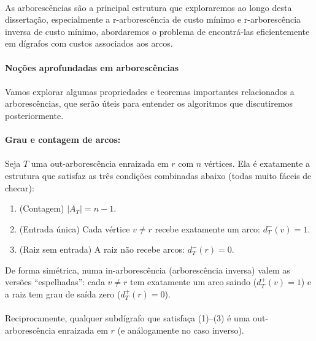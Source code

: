 \documentclass[12pt,a4paper]{article}
\def\emph#1{#1}%
\begin{document}
\paragraph{}
As arborescências são a principal estrutura que exploraremos ao longo desta dissertação, especialmente a r-arborescência de custo mínimo e r-arborescência inversa de custo mínimo, abordaremos o problema de encontrá-las eficientemente em dígrafos com custos associados aos arcos.



\paragraph{Noções aprofundadas em arborescências}

\paragraph{}
Vamos explorar algumas propriedades e teoremas importantes relacionados a arborescências, que serão úteis para entender os algoritmos que discutiremos posteriormente.

\paragraph{Grau e contagem de arcos:}
\paragraph{}
Seja $T$ uma out-arborescência enraizada em $r$ com $n$ vértices. Ela é exatamente a estrutura que satisfaz as três condições combinadas abaixo (todas muito fáceis de checar):
\begin{enumerate}\setlength{\itemsep}{2pt}
    \item (Contagem) $|A_T| = n-1$.
    \item (Entrada única) Cada vértice $v\neq r$ recebe exatamente um arco: $d_T^-(v)=1$.
    \item (Raiz sem entrada) A raiz não recebe arcos: $d_T^-(r)=0$.
\end{enumerate}
De forma simétrica, numa in-arborescência (arborescência inversa) valem as versões “espelhadas”: cada $v\neq r$ tem exatamente um arco \emph{saindo} ($d_T^+(v)=1$) e a raiz tem grau de saída zero ($d_T^+(r)=0$).

\paragraph{}
Reciprocamente, qualquer subdígrafo que satisfaça (1)--(3) é uma out-arborescência enraizada em $r$ (e análogamente no caso inverso). 
\end{document}
